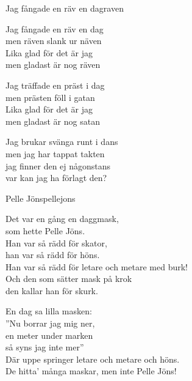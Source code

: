 \begin{song}{Jag fångade en räv en dag}{raven} 
\begin{vers}
Jag fångade en räv en dag\\ 
men räven slank ur näven\\
Lika glad för det är jag\\
men gladast är nog räven\\
\end{vers}
\begin{vers}
Jag träffade en präst i dag\\
men prästen föll i gatan\\
Lika glad för det är jag\\ 
men gladast är nog satan\\
\end{vers}

\begin{vers}
Jag brukar svänga runt i dans\\
men jag har tappat takten\\
jag finner den ej någonstans\\
var kan jag ha förlagt den?\\
\end{vers}

\end{song}
\newpage

\begin{song}{Pelle Jöns}{pellejons}
\begin{vers}
Det var en gång en daggmask,\\
som hette Pelle Jöns.\\
Han var så rädd för skator,\\
han var så rädd för höns.\\
Han var så rädd för letare och metare med burk!\\
Och den som sätter mask på krok\\ 
den kallar han för skurk.\\
\end{vers}
\begin{vers}
En dag sa lilla masken:\\
''Nu borrar jag mig ner,\\
en meter under marken\\
så syns jag inte mer''\\
Där uppe springer letare och metare och höns.\\
De hitta' många maskar, men inte Pelle Jöns!\\
\end{vers}
\end{song}


